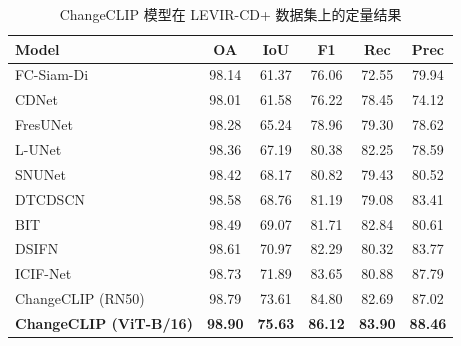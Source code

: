 \begin{table}[!htbp]
  \centering
  \caption{ChangeCLIP 模型在 LEVIR-CD+ 数据集上的定量结果}
  \label{tab:changeclip_levirplus}
  \begin{tabular*}{\textwidth}{@{\extracolsep{\fill}} l c c c c c}
    \toprule
    Model & OA & IoU & F1 & Rec & Prec \\
    \midrule
    FC-Siam-Di~\cite{Daudt2018FullyCS}               & 98.14 & 61.37 & 76.06 & 72.55 & 79.94 \\
    CDNet~\cite{Alcantarilla2016StreetviewCD}                    & 98.01 & 61.58 & 76.22 & 78.45 & 74.12 \\
    FresUNet~\cite{Daudt2018MultitaskLF}                 & 98.28 & 65.24 & 78.96 & 79.30 & 78.62 \\
    L-UNet~\cite{Papadomanolaki2021ADM}                   & 98.36 & 67.19 & 80.38 & 82.25 & 78.59 \\
    SNUNet~\cite{Fang2021SNUNetCDAD}                   & 98.42 & 68.17 & 80.82 & 79.43 & 80.52 \\
    DTCDSCN~\cite{Liu2019BuildingCD}                  & 98.58 & 68.76 & 81.19 & 79.08 & 83.41 \\
    BIT~\cite{chen_remote_2022}                      & 98.49 & 69.07 & 81.71 & 82.84 & 80.61 \\
    DSIFN~\cite{Zhang2020ADS}                    & 98.61 & 70.97 & 82.29 & 80.32 & 83.77 \\
    ICIF-Net~\cite{Feng2022ICIFNetIC}                 & 98.73 & 71.89 & 83.65 & 80.88 & 87.79 \\
    ChangeCLIP (RN50)        & 98.79 & 73.61 & 84.80 & 82.69 & 87.02 \\
    \textbf{ChangeCLIP (ViT-B/16)} & \textbf{98.90} & \textbf{75.63} & \textbf{86.12} & \textbf{83.90} & \textbf{88.46} \\
    \bottomrule
  \end{tabular*}
\end{table}

